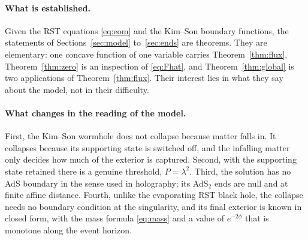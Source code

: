 \documentclass[11pt]{article}
\theoremstyle{remark}
\begin{document}
\paragraph{What is established.} Given the RST equations \eqref{eq:eom} and the Kim--Son boundary functions, the statements of Sections~\ref{sec:model} to~\ref{sec:ends} are theorems. They are elementary: one concave function of one variable carries Theorem~\ref{thm:flux}, Theorem~\ref{thm:zero} is an inspection of \eqref{eq:Fhat}, and Theorem~\ref{thm:global} is two applications of Theorem~\ref{thm:flux}. Their interest lies in what they say about the model, not in their difficulty.

\paragraph{What changes in the reading of the model.} First, the Kim--Son wormhole does not collapse because matter falls in. It collapses because its supporting state is switched off, and the infalling matter only decides how much of the exterior is captured. Second, with the supporting state retained there is a genuine threshold, $P=\lambda^2$. Third, the solution has no AdS boundary in the sense used in holography; its AdS$_2$ ends are null and at finite affine distance. Fourth, unlike the evaporating RST black hole, the collapse needs no boundary condition at the singularity, and its final exterior is known in closed form, with the mass formula \eqref{eq:mass} and a value of $e^{-2\phi}$ that is monotone along the event horizon.
\end{document}
